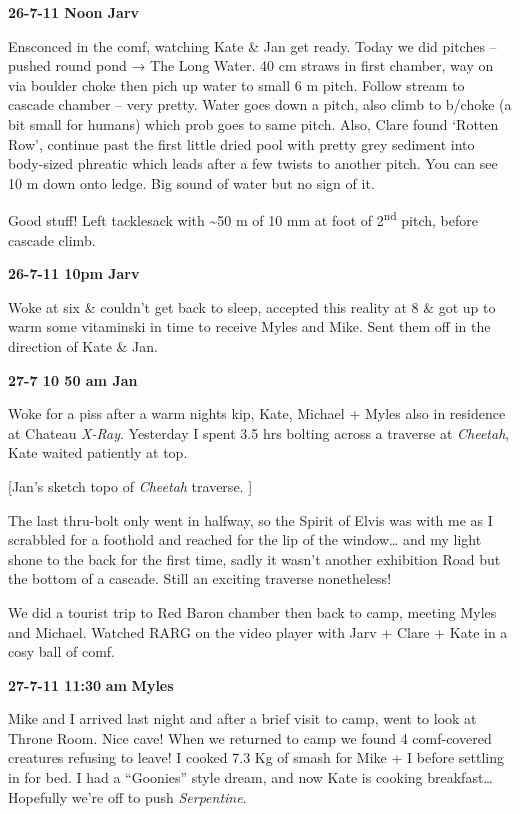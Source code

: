 \textbf{26-7-11 Noon Jarv}

Ensconced in the comf, watching Kate \& Jan get ready. Today we did
pitches -- pushed round pond → The Long Water. 40 cm straws in first
chamber, way on via boulder choke then pich up water to small 6 m pitch.
Follow stream to cascade chamber -- very pretty. Water goes down a
pitch, also climb to b/choke (a bit small for humans) which prob goes to
same pitch. Also, Clare found `Rotten Row', continue past the first
little dried pool with pretty grey sediment into body-sized phreatic
which leads after a few twists to another pitch. You can see 10 m down
onto ledge. Big sound of water but no sign of it.

Good stuff! Left tacklesack with \textasciitilde 50 m of 10 mm at foot
of 2\textsuperscript{nd} pitch, before cascade climb.

\textbf{26-7-11 10pm Jarv}

Woke at six \& couldn't get back to sleep, accepted this reality at 8 \&
got up to warm some vitaminski in time to receive Myles and Mike. Sent
them off in the direction of Kate \& Jan.

\textbf{27-7 10 50 am Jan}

Woke for a piss after a warm nights kip, Kate, Michael + Myles also in
residence at Chateau \emph{X-Ray}. Yesterday I spent 3.5 hrs bolting
across a traverse at \emph{Cheetah}, Kate waited patiently at top.

{[}Jan's sketch topo of \emph{Cheetah} traverse. {]}

The last thru-bolt only went in halfway, so the Spirit of Elvis was with
me as I scrabbled for a foothold and reached for the lip of the
window\ldots{} and my light shone to the back for the first time, sadly
it wasn't another exhibition Road but the bottom of a cascade. Still an
exciting traverse nonetheless!

We did a tourist trip to Red Baron chamber then back to camp, meeting
Myles and Michael. Watched RARG on the video player with Jarv + Clare +
Kate in a cosy ball of comf.

\textbf{27-7-11 11:30} \textbf{am} \textbf{Myles}

Mike and I arrived last night and after a brief visit to camp, went to
look at Throne Room. Nice cave! When we returned to camp we found 4
comf-covered creatures refusing to leave! I cooked 7.3 Kg of smash for
Mike + I before settling in for bed. I had a ``Goonies'' style dream,
and now Kate is cooking breakfast\ldots{} Hopefully we're off to push
\emph{Serpentine}.


